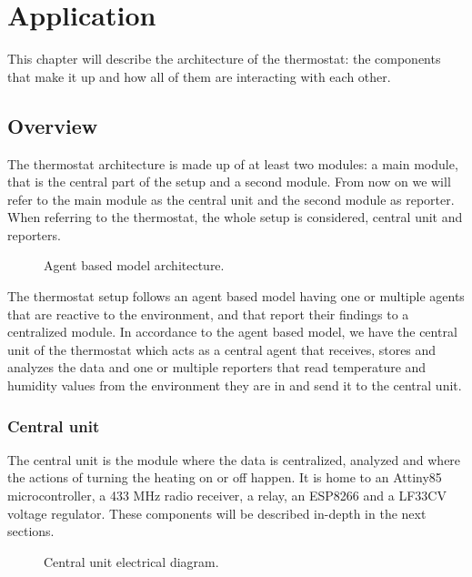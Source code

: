 \chapter{Application}
\label{chap:architecture}

\qquad This chapter will describe the architecture of the thermostat: the components that make it up and how
all of them are interacting with each other.

\section{Overview}

The thermostat architecture is made up of at least two modules: a main module, that is the central part of the
setup and a second module. From now on we will refer to the main module as the central unit and the second
module as reporter. When referring to the thermostat, the whole setup is considered, central unit and
reporters.

\begin{figure}[h!]
    \label{fig:general_architecture}
    \centerline{}
    \caption[Architecture Diagram]{Agent based model architecture.}
    \label{fig:general_architecture}
\end{figure}

The thermostat setup follows an agent based model having one or multiple agents that are reactive to the
environment, and that report their findings to a centralized module.
In accordance to the agent based model, we have the central unit of the thermostat which acts as a central
agent that receives, stores and analyzes the data and one or multiple reporters that read temperature and
humidity values from the environment they are in and send it to the central unit.



\subsection{Central unit}

\qquad The central unit is the module where the data is centralized, analyzed and where the actions of turning the
heating on or off happen.
It is home to an Attiny85 microcontroller, a 433 MHz radio receiver, a relay, an ESP8266 and a LF33CV voltage
regulator. These components will be described in-depth in the next sections.

\begin{figure}[h!]
    \label{fig:central_unit_diag}
    \centerline{}
    \caption[Central Unit Electrical Diagram]{Central unit electrical diagram.}
    \label{fig:central_unit_diag}
\end{figure}

